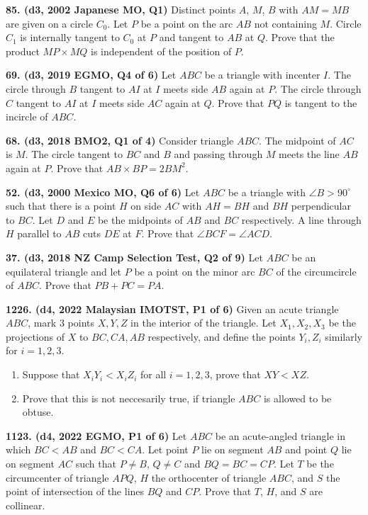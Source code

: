 \documentclass{article}
\begin{document}
\textbf{85. (\color{red}d3\color{black}, 2002 Japanese MO, Q1)} Distinct points $A$, $M$, $B$ with $AM=MB$ are given on a circle $C_0$. Let $P$ be a point on the arc $AB$ not containing $M$. Circle $C_1$ is internally tangent to $C_0$ at $P$ and tangent to $AB$ at $Q$. Prove that the product $MP \times MQ$ is independent of the position of $P$.

\textbf{69. (\color{red}d3\color{black}, 2019 EGMO, Q4 of 6)} Let \(ABC\) be a triangle with incenter \(I\). The circle through \(B\) tangent to \(AI\) at \(I\) meets side \(AB\) again at \(P\). The circle through \(C\) tangent to \(AI\) at \(I\) meets side \(AC\) again at \(Q\). Prove that \(PQ\) is tangent to the incircle of \(ABC\).

\textbf{68. (\color{red}d3\color{black}, 2018 BMO2, Q1 of 4)} Consider triangle \(ABC\). The midpoint of \(AC\) is \(M\). The circle tangent to \(BC\) and \(B\) and passing through \(M\) meets the line \(AB\) again at \(P\). Prove that \(AB\times BP=2BM^2\).

\textbf{52. (\color{red}d3\color{black}, 2000 Mexico MO, Q6 of 6)} Let $ABC$ be a triangle with $\angle B > 90^{\circ}$ such that there is a point $H$ on side $AC$ with $AH = BH$ and $BH$ perpendicular to $BC$. Let $D$ and $E$ be the midpoints of $AB$ and $BC$ respectively. A line through $H$ parallel to $AB$ cuts $DE$ at $F$. Prove that $\angle BCF = \angle ACD$.

\textbf{37. (\color{red}d3\color{black}, 2018 NZ Camp Selection Test, Q2 of 9)} Let \(ABC\) be an equilateral triangle and let \(P\) be a point on the minor arc \(BC\) of the circumcircle of \(ABC\). Prove that \(PB+PC=PA\).

\textbf{1226. (\color{red}d4\color{black}, 2022 Malaysian IMOTST, P1 of 6)} Given an acute triangle $ABC$, mark $3$ points $X, Y, Z$ in the interior of the triangle. Let $X_1, X_2, X_3$ be the projections of $X$ to $BC, CA, AB$ respectively, and define the points $Y_i, Z_i$ similarly for $i=1, 2, 3$.
\begin{enumerate}
    \item Suppose that $X_iY_i<X_iZ_i$ for all $i=1,2,3$, prove that $XY<XZ$.
    \item Prove that this is not neccesarily true, if triangle $ABC$ is allowed to be obtuse.
\end{enumerate}

\textbf{1123. (\color{red}d4\color{black}, 2022 EGMO, P1 of 6)} Let $ABC$ be an acute-angled triangle in which $BC<AB$ and $BC<CA$. Let point $P$ lie on segment $AB$ and point $Q$ lie on segment $AC$ such that $P \neq B$, $Q \neq C$ and $BQ = BC = CP$. Let $T$ be the circumcenter of triangle $APQ$, $H$ the orthocenter of triangle $ABC$, and $S$ the point of intersection of the lines $BQ$ and $CP$. Prove that $T$, $H$, and $S$ are collinear.
\end{document}
